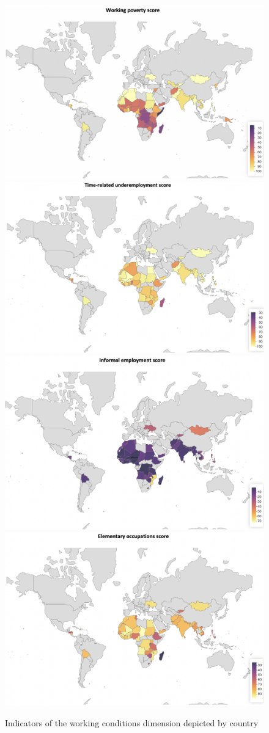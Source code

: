 \documentclass[
  a4paper, twoside, 12pt]{book}
\begin{document}
\begin{figure}[H]

{\centering \includegraphics[width=0.52\linewidth,]{figures/maps/workingpoverty_total} \includegraphics[width=0.52\linewidth,]{figures/maps/underemployment_total} \includegraphics[width=0.52\linewidth,]{figures/maps/informal_total} \includegraphics[width=0.52\linewidth,]{figures/maps/elementaryoccup_total} 

}

\caption{Indicators of the working conditions dimension depicted by country}\label{fig:fig-workcondmap}
\end{figure}
\end{document}
